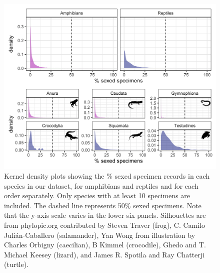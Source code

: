 \documentclass[a4paper, 12pt]{article}
\begin{document}
\newpage
\begin{figure}[h]
 \centering
  \includegraphics[width = \linewidth]{figures/unsexed-class-order-density.png}
  \caption{Kernel density plots showing the \% sexed specimen records in each species in our dataset, for amphibians and reptiles and for each order separately. Only species with at least 10 specimens are included. The dashed line represents 50\% sexed specimens. Note that the y-axis scale varies in the lower six panels. Silhouettes are from phylopic.org contributed by Steven Traver (frog), C. Camilo Julián-Caballero (salamander), Yan Wong from illustration by Charles Orbigny (caecilian), B Kimmel (crocodile), Ghedo and T. Michael Keesey (lizard), and James R. Spotila and Ray Chatterji (turtle).
}
  \label{fig-sexed}
\end{figure}
\end{document}
